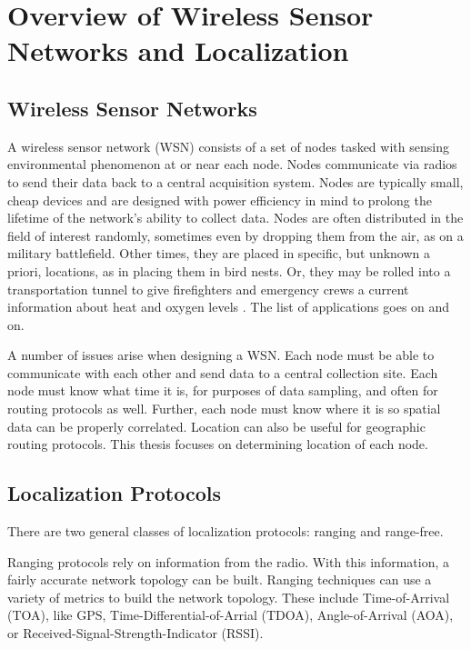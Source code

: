 \chapter{Overview of Wireless Sensor Networks and Localization}
\section{Wireless Sensor Networks}

A wireless sensor network (WSN) consists of a set of nodes tasked with sensing environmental phenomenon at or near each node.  Nodes communicate via radios to send their data back to a central acquisition system.  Nodes are typically small, cheap devices and are designed with power efficiency in mind to prolong the lifetime of the network's ability to collect data.  Nodes are often distributed in the field of interest randomly, sometimes even by dropping them from the air, as on a military battlefield.  Other times, they are placed in specific, but unknown a priori, locations, as in placing them in bird nests\cite{birds}.  Or, they may be rolled into a transportation tunnel to give firefighters and emergency crews a current information about heat and oxygen levels \cite{runes}.  The list of applications goes on and on.

A number of issues arise when designing a WSN.  Each node must be able to communicate with each other and send data to a central collection site.  Each node must know what time it is, for purposes of data sampling, and often for routing protocols as well.  Further, each node must know where it is so spatial data can be properly correlated.  Location can also be useful for geographic routing protocols.  This thesis focuses on determining location of each node.

\section{Localization Protocols}

There are two general classes of localization protocols: ranging and range-free.  

Ranging protocols rely on information from the radio. With this information, a fairly accurate network topology can be built.  Ranging techniques can use a variety of metrics to build the network topology.  These include Time-of-Arrival (TOA), like GPS\cite{Wellenhoff},  Time-Differential-of-Arrial (TDOA)\cite{Savvides}, Angle-of-Arrival (AOA)\cite{Niculescu}, or Received-Signal-Strength-Indicator (RSSI)\cite{Patwari}.  

